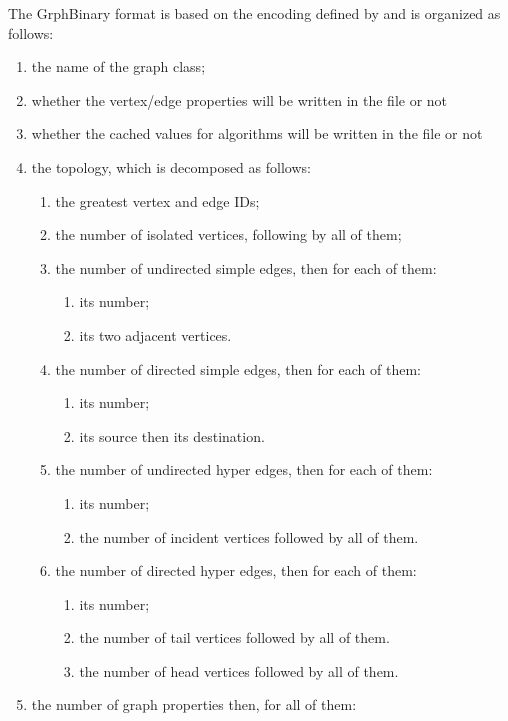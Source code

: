 \documentclass{article}
\begin{document}
The GrphBinary format is based on the encoding defined by  and is organized  as follows:
\begin{enumerate}
  \item the name of the graph class;
  \item whether the vertex/edge properties will be written in the file or not
  \item whether the cached values for algorithms will be written in the file or not
  \item the topology, which is decomposed as follows:
  \begin{enumerate}
    \item the greatest vertex and edge IDs;
    \item the number of isolated vertices, following by all of them;
    \item the number of undirected simple edges, then for each of them:
	  	\begin{enumerate}
	  	\item its number;
	  	\item its two adjacent vertices.
		\end{enumerate}
    \item the number of directed simple edges, then for each of them:
	  	\begin{enumerate}
	  	\item its number;
	  	\item its source then its destination.
		\end{enumerate}
    \item the number of undirected hyper edges, then for each of them:
	  	\begin{enumerate}
	  	\item its number;
	  	\item the number of incident vertices followed by all of them.
		\end{enumerate}
    \item the number of directed hyper edges, then for each of them:
	  	\begin{enumerate}
	  	\item its number;
	  	\item the number of tail vertices followed by all of them.
	  	\item the number of head vertices followed by all of them.
		\end{enumerate}
    \end{enumerate}
  \item the number of graph properties then, for all of them:

\end{enumerate}
\end{document}
